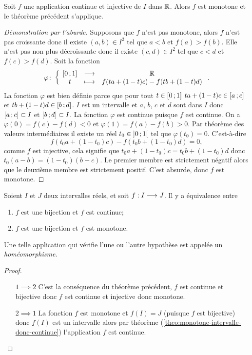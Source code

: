 \begin{theo}
  Soit \(f\) une application continue et injective de \(I\) dans \(\mathbb{R}\). Alors \(f\) est monotone et le théorème précédent s'applique.
\end{theo}
\begin{proof}[Démonstration par l'aburde]
  Supposons que \(f\) n'est pas monotone, alors \(f\) n'est pas croissante donc il existe \((a,b) \in I^2\) tel que \(a < b\) et \(f(a) > f(b)\). Elle n'est pas non plus décroissante donc il existe \((c,d) \in I^2\) tel que \(c < d\) et \(f(c) > f(d)\). Soit la fonction
  \begin{equation}
    \varphi\colon \left\{\begin{array}{ccc} \left[ 0 \, ;  1 \right] & \longrightarrow &\mathbb{R}\\ t & \longmapsto & f(ta+(1-t)c)-f(tb+(1-t)d) \end{array} \right..
  \end{equation}
  La fonction \(\varphi\) est bien définie parce que pour tout \(t \in \left[ 0 \, ;  1 \right]\) \(ta+(1-t)c \in \left[ a \, ;  c \right]\) et \(tb+(1-t)d \in \left[ b \, ;  d \right]\). \(I\) est un intervalle et \(a\), \(b\), \(c\) et \(d\) sont dans \(I\) donc \(\left[ a \, ;  c \right] \subset I\) et \(\left[ b \, ;  d \right] \subset I\). La fonction \(\varphi\) est continue puisque \(f\) est continue. On a \(\varphi(0)=f(c)-f(d) <0\) et \(\varphi(1)=f(a)-f(b) >0\). Par théorème des valeurs intermédiaires il existe un réel \(t_0 \in \left] 0 \, ;  1 \right[\) tel que \(\varphi(t_0)=0\). C'est-à-dire
\begin{equation}
  f(t_0a+(1-t_0)c)-f(t_0b+(1-t_0)d)=0,
\end{equation}
comme \(f\) est injective, cela signifie que \(t_0a+(1-t_0)c=t_0b+(1-t_0)d\) donc \(t_0(a-b)=(1-t_0)(b-c)\). Le premier membre est strictement négatif alors que le deuxième membre est strictement positif. C'est absurde, donc \(f\) est monotone.
\end{proof}
\begin{cor}
  Soient \(I\) et \(J\) deux intervalles réels, et soit \(f:I \longrightarrow J\). Il y a équivalence entre
  \begin{enumerate}
  \item \(f\) est une bijection et \(f\) est continue;
  \item \(f\) est une bijection et \(f\) est monotone.
  \end{enumerate}
  Une telle application qui vérifie l'une ou l'autre hypothèse est appelée un \emph{homéomorphisme}.
\end{cor}
\begin{proof}
  \begin{itemize}
  \item[\(1 \implies 2\)] C'est la conséquence du théorème précédent, \(f\) est continue et bijective donc \(f\) est continue et injective donc monotone.
  \item[\(2 \implies 1\)] La fonction \(f\) est monotone et \(f(I)=J\) (puisque \(f\) est bijective) donc \(f(I)\) est un intervalle alors par théorème (\ref{theo:monotone-intervalle-donc-continue}) l'application \(f\) est continue.
  \end{itemize}
\end{proof}

